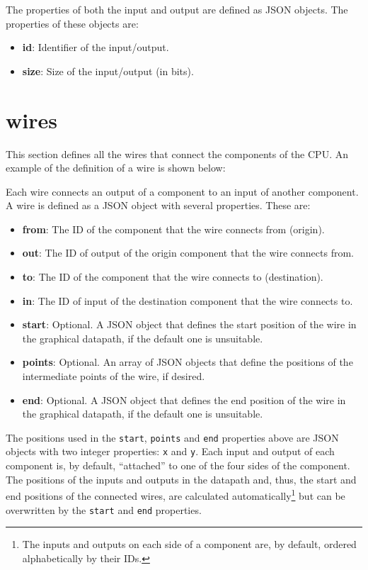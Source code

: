 \documentclass[11pt,a4paper,twoside,titlepage]{report}
\begin{document}
The properties of both the input and output are defined as JSON objects. 
The properties of these objects are:
\begin{itemize}
	\item \textbf{id}: Identifier of the input/output.
	\item \textbf{size}: Size of the input/output (in bits).
\end{itemize}


\section{wires}

This section defines all the wires that connect the components of the CPU.
An example of the definition of a wire is shown below:



Each wire connects an output of a component to an input of another component.
A wire is defined as a JSON object with several properties.
These are:

\begin{itemize}
	\item \textbf{from}: The ID of the component that the wire connects from (origin).
	\item \textbf{out}: The ID of output of the origin component that the wire
		connects from.
	\item \textbf{to}: The ID of the component that the wire connects to (destination).
	\item \textbf{in}: The ID of input of the destination component that the wire
		connects to.
	\item \textbf{start}: Optional. A JSON object that defines the start position of
		the wire in the graphical datapath, if the default one is unsuitable.
	\item \textbf{points}: Optional. An array of JSON objects that define the
		positions of the intermediate points of the wire, if desired.
	\item \textbf{end}: Optional. A JSON object that defines the end position of
		the wire in the graphical datapath, if the default one is unsuitable.
\end{itemize}

The positions used in the \verb+start+, \verb+points+ and \verb+end+ properties
above are JSON objects with two integer properties: \verb+x+ and \verb+y+.
Each input and output of each component is, by default, ``attached'' to one of
the four sides of the component.
The positions of the inputs and outputs in the datapath and, thus, the start and
end positions of the connected wires, are calculated automatically\footnote{The
inputs and outputs on each side of a component are, by default, ordered 
alphabetically by their IDs.} but can be overwritten by the \verb+start+ and 
\verb+end+ properties.
\end{document}
